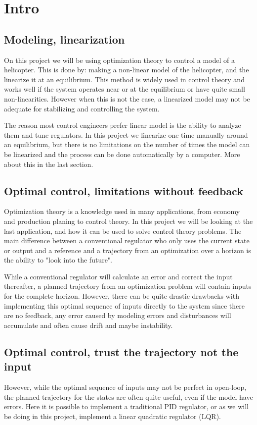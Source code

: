 \section{Intro}
\subsection{Modeling, linearization}
On this project we will be using optimization theory to control a model of a helicopter. This is done by:
 making a non-linear model of the helicopter, and the linearize it at an equilibrium. This method is widely used in control theory and works well if the system operates near or at the equilibrium or have quite small non-linearities. However when this is not the case, a linearized model may not be adequate for stabilizing and controlling the system.

 The reason most control engineers prefer linear model is the ability to analyze them and tune regulators. In this project we linearize one time manually around an equilibrium, but there is no limitations on the number of times the model can be linearized and the process can be done automatically by a computer. More about this in the last section.

\subsection{Optimal control, limitations without feedback}
Optimization theory is a knowledge used in many applications, from economy and production planing to control theory. In this project we will be looking at the last application, and how it can be used to solve control theory problems. The main difference between a conventional regulator who only uses the current state or output and a reference and a trajectory from an optimization over a horizon is the ability to "look into the future". 

While a conventional regulator will calculate an error and correct the input thereafter, a planned trajectory from an optimization problem will contain inputs for the complete horizon. However, there can be quite drastic drawbacks with implementing this optimal sequence of inputs directly to the system since there are no feedback, any error caused by modeling errors and disturbances will accumulate and often cause drift and maybe instability.

\subsection{Optimal control, trust the trajectory not the input}
However, while the optimal sequence of inputs may not be perfect in open-loop, the planned trajectory for the states are often quite useful, even if the model have errors. Here it is possible to implement a traditional PID regulator, or as we will be doing in this project, implement a linear quadratic regulator (LQR). 

